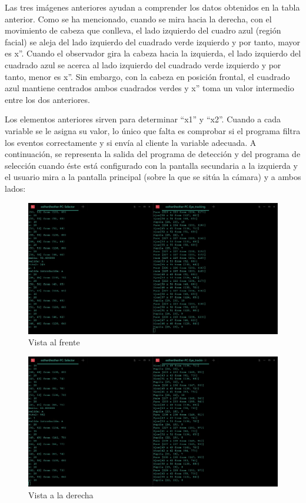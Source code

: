 Las tres imágenes anteriores ayudan a comprender los datos obtenidos en la tabla anterior. Como se ha mencionado, cuando se mira hacia la derecha, con el movimiento de cabeza que conlleva, el lado izquierdo del cuadro azul (región facial) se aleja del lado izquierdo del cuadrado verde izquierdo y por tanto, mayor es x''. Cuando el observador gira la cabeza hacia la izquierda, el lado izquierdo del cuadrado azul se acerca al lado izquierdo del cuadrado verde izquierdo y por tanto, menor es x''. Sin embargo, con la cabeza en posición frontal, el cuadrado azul mantiene centrados ambos cuadrados verdes y x'' toma un valor intermedio entre los dos anteriores. 

Los elementos anteriores sirven para determinar ``x1'' y ``x2''. Cuando a cada variable se le asigna su valor, lo único que falta es comprobar si el programa filtra los eventos correctamente y si envía al cliente la variable adecuada. A continuación, se representa la salida del programa de detección y del programa de selección cuando éste está configurado con la pantalla secundaria a la izquierda y el usuario mira a la pantalla principal (sobre la que se sitúa la cámara) y a ambos lados:

    \begin{figure}[H]
    \centering
    \includegraphics[scale = 0.3]{capitulo_04/figuras_dir/ldcentro.jpg}
    \caption{Vista al frente}
    \end{figure}

    \begin{figure}[H]
    \centering
    \includegraphics[scale = 0.3]{capitulo_04/figuras_dir/ldder.jpg}
    \caption{Vista a la derecha}
    \end{figure}

